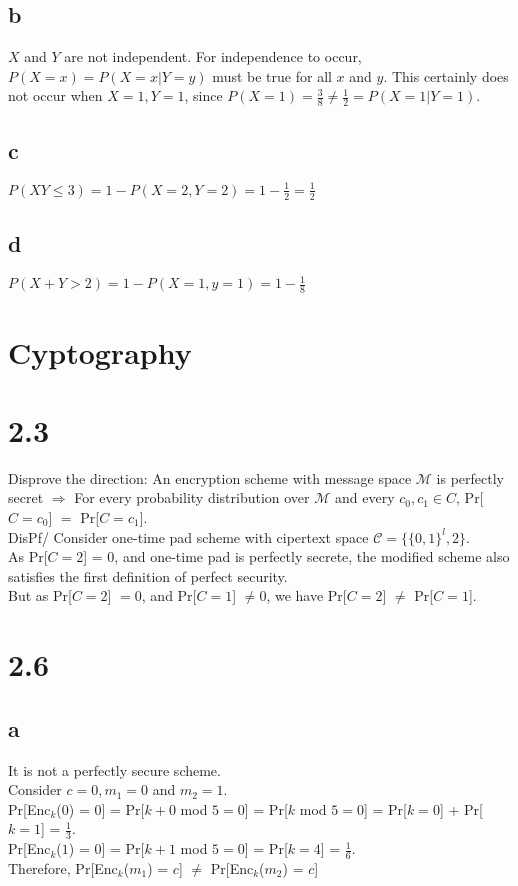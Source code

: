 \documentclass{article}
\begin{document}
\subsection*{b} $X$ and $Y$ are not independent. For independence to occur, $P(X=x) = P(X=x|Y=y)$ must be true for all $x$ and $y$. This certainly does not occur when $X=1,Y=1$, since $P(X=1) = \frac{3}{8} \neq \frac{1}{2} = P(X=1|Y=1).$
\subsection*{c}$P(XY\leq3) = 1-P(X=2,Y=2)=1-\frac{1}{2} =\frac{1}{2}$
\subsection*{d}$P(X+Y>2) = 1-P(X=1,y=1)= 1-\frac{1}{8}$

\section*{Cyptography}
\section*{2.3} Disprove the direction: An encryption scheme with message space $\mathcal{M}$ is perfectly secret $\Rightarrow$ For every probability distribution over $\mathcal{M}$ and every $c_0,c_1 \in C$, Pr[$C=c_0$] $=$ Pr[$C=c_1$].\\
\newline
\noindent
DisPf/ Consider one-time pad scheme with cipertext space $\mathcal{C} = \{\{0,1\}^l,2\}$.\\
As Pr[$C=2$] = 0, and one-time pad is perfectly secrete, the modified scheme also satisfies the first definition of perfect security.\\
But as Pr[$C=2$] $= 0$, and Pr[$C=1$] $\neq 0$, we have Pr[$C=2$] $\neq$ Pr[$C=1$].\\

\section*{2.6}
\subsection*{a} It is not a perfectly secure scheme.\\
Consider $c = 0, m_1 = 0$ and $m_2 = 1$.\\
Pr[Enc$_{k}$($0$) = $0$] = Pr[$k+0$ mod $5 = 0$] = Pr[$k$ mod $5=0$] = Pr[$k=0$] + Pr[$k=1$] = $\frac{1}{3}$.\\
Pr[Enc$_{k}$($1$) = $0$] = Pr[$k+1$ mod $5 = 0$] = Pr[$k=4$] = $\frac{1}{6}$.\\
Therefore, Pr[Enc$_{k}$($m_1$) = $c$]  $\neq$ Pr[Enc$_{k}$($m_2$) = $c$] 
\end{document}
